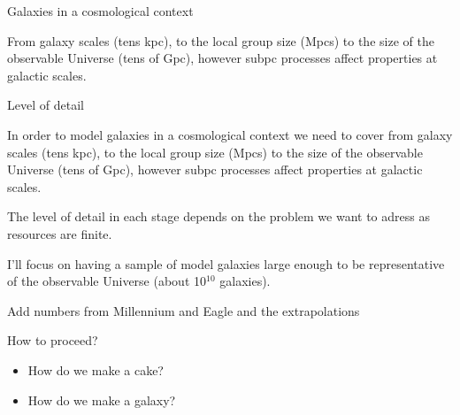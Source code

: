 \documentclass{beamer}
\begin{document}
\begin{frame}{Galaxies in a cosmological context}

From galaxy scales (tens kpc), to the local group size (Mpcs) to the size of the observable Universe (tens of Gpc), however subpc processes affect properties at galactic scales. 

\end{frame}

\begin{frame}{Level of detail}

In order to model galaxies in a cosmological context we need to cover from galaxy scales (tens kpc), to the local group size (Mpcs) to the size of the observable Universe (tens of Gpc), however subpc processes affect properties at galactic scales. 

The level of detail in each stage depends on the problem we want to adress as resources are finite. 

I'll focus on having a sample of model galaxies large enough to be representative of the observable Universe (about 10$^{10}$ galaxies).

{\color{red} Add numbers from Millennium and Eagle and the extrapolations}
\end{frame}

\begin{frame}{How to proceed?}
\begin{itemize}
\item<1->{ How do we make a cake?
}
\item<2->{ How do we make a galaxy?
}
\end{itemize}
\end{frame}
\end{document}
